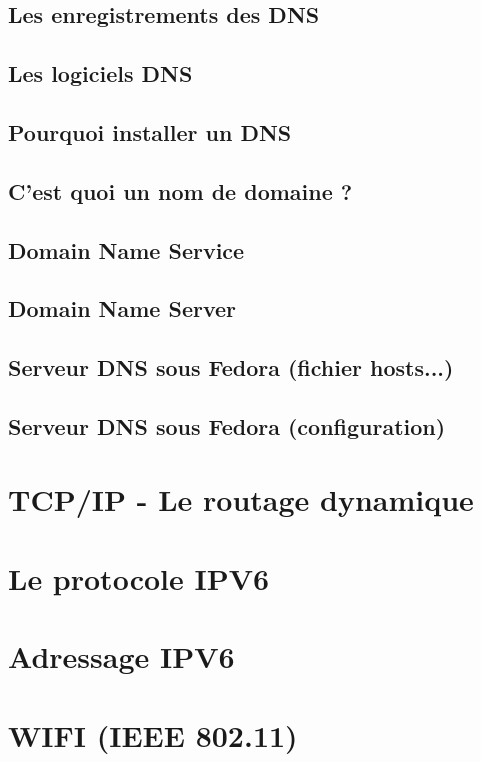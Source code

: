 \documentclass[12pt]{article}
\begin{document}
\subsection{Les enregistrements des DNS}


\subsection{Les logiciels DNS}


\subsection{Pourquoi installer un DNS}


\subsection{C’est quoi un nom de domaine ?}


\subsection{Domain Name Service}


\subsection{Domain Name Server}


\subsection{Serveur DNS sous Fedora (fichier hosts...)}


\subsection{Serveur DNS sous Fedora (configuration)}





\section{TCP/IP - Le routage dynamique}

\section{Le protocole IPV6}

\section{Adressage IPV6}

\section{WIFI (IEEE 802.11)}
\end{document}
